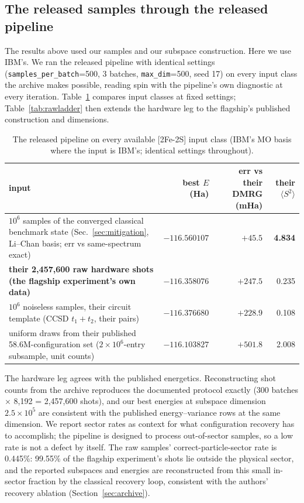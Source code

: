 \documentclass[11pt]{article}
\newcommand{\ssq}{\ensuremath{\langle S^2\rangle}}
\begin{document}
\subsection{The released samples through the released pipeline}\label{sec:theirsamples}

The results above used our samples and our subspace construction. Here we use IBM's. We ran the released pipeline with identical settings (\texttt{samples\_per\_batch}=500, 3 batches, \texttt{max\_dim}=500, seed 17) on every input class the archive makes possible, reading spin with the pipeline's own diagnostic at every iteration. Table~\ref{tab:theirsamples} compares input classes at fixed settings; Table~\ref{tab:rawladder} then extends the hardware leg to the flagship's published construction and dimensions.

\begin{table}[ht]\centering\small
\caption{The released pipeline on every available [2Fe-2S] input class (IBM's MO basis where the input is IBM's; identical settings throughout).}
\label{tab:theirsamples}
\begin{tabular}{p{7.2cm}rrr}
\toprule
input & best $E$ (Ha) & err vs their DMRG (mHa) & their \ssq \\
\midrule
$10^6$ samples of the converged classical benchmark state (Sec.~\ref{sec:mitigation}, Li--Chan basis; err vs same-spectrum exact) & $-116.560107$ & $\mathbf{+45.5}$ & \textbf{4.834} \\
\textbf{their 2{,}457{,}600 raw hardware shots (the flagship experiment's own data)} & $-116.358076$ & $+247.5$ & 0.235 \\
$10^6$ noiseless samples, their circuit template (CCSD $t_1{+}t_2$, their pairs) & $-116.376680$ & $+228.9$ & 0.108 \\
uniform draws from their published 58.6M-configuration set ($2\times10^6$-entry subsample, unit counts) & $-116.103827$ & $+501.8$ & 2.008 \\
\bottomrule
\end{tabular}
\end{table}

The hardware leg agrees with the published energetics. Reconstructing shot counts from the archive reproduces the documented protocol exactly (300 batches $\times$ 8{,}192 = 2{,}457{,}600 shots), and our best energies at subspace dimension $2.5\times10^5$ are consistent with the published energy--variance rows at the same dimension. We report sector rates as context for what configuration recovery has to accomplish; the pipeline is designed to process out-of-sector samples, so a low rate is not a defect by itself. The raw samples' correct-particle-sector rate is 0.445\%: 99.55\% of the flagship experiment's shots lie outside the physical sector, and the reported subspaces and energies are reconstructed from this small in-sector fraction by the classical recovery loop, consistent with the authors' recovery ablation (Section~\ref{sec:archive}).
\end{document}
